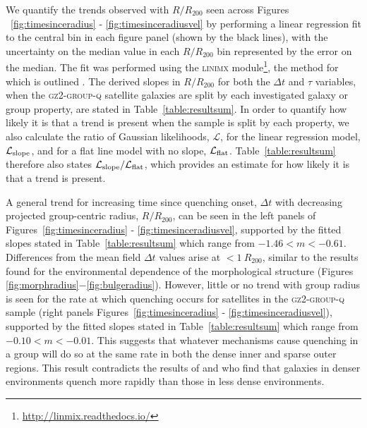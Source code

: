 \documentclass[useAMS,usenatbib]{mn2e}
\def\minor		{\color{minorcol}}
\begin{document}
We quantify the trends observed with $R/R_{200}$ seen across Figures ~\ref{fig:timesinceradius} - \ref{fig:timesinceradiusvel} by performing a linear regression fit to the central bin in each figure panel (shown by the black lines), with the uncertainty on the median value in each $R/R_{200}$ bin represented by the error on the median. The fit was performed using the \textsc{linimx} module\footnote{\url{http://linmix.readthedocs.io/}}, the method for which is outlined \citealt{kelly07}. The derived slopes in $R/R_{200}$ for both the $\Delta t$ and $\tau$ variables, when the \textsc{gz2-group-q} satellite galaxies are split by each investigated galaxy or group property, are stated in Table~\ref{table:resultsum}. {\minor In order to quantify how likely it is that a trend is present when the sample is split by each property, we also calculate the ratio of Gaussian likelihoods, $\mathcal{L}$, for the linear regression model, $\mathcal{L}_{\rm{slope}}$, and for a flat line model with no slope, $\mathcal{L}_{\rm{flat}}$. Table~\ref{table:resultsum} therefore also states $\mathcal{L}_{\rm{slope}}/\mathcal{L}_{\rm{flat}}$, which provides an estimate for how likely it is that a trend is present.}


A general trend for increasing time since quenching onset, $\Delta t$ with decreasing projected group-centric radius, $R/R_{200}$, can be seen in the left panels of Figures~\ref{fig:timesinceradius} - \ref{fig:timesinceradiusvel}, supported by the fitted slopes stated in Table~\ref{table:resultsum} which range from $-1.46 < m < -0.61$. Differences from the mean field $\Delta t$ values arise at $<1~R_{200}$, similar to the results found for the environmental dependence of the morphological structure (Figures \ref{fig:morphradius}$-$\ref{fig:bulgeradius}). However, little or no trend with group radius is seen for the rate at which quenching occurs for satellites in the \textsc{gz2-group-q} sample (right panels Figures~\ref{fig:timesinceradius} - \ref{fig:timesinceradiusvel}), supported by the fitted slopes stated in Table~\ref{table:resultsum} which range from $-0.10 < m < -0.01$. This suggests that whatever mechanisms cause quenching in a group will do so at the same rate in both the dense inner and sparse outer regions. {\minor This result contradicts the results of \citet{rettura10, rettura11, ferre14} and \cite{darvish16} who find that galaxies in denser environments quench more rapidly than those in less dense environments.}
\end{document}
